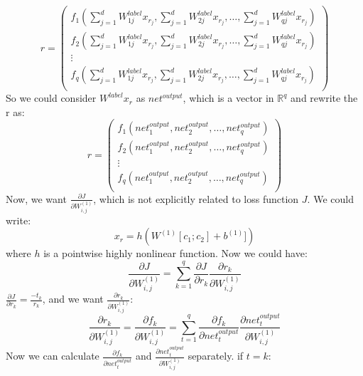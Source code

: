 \documentclass[twoside,12pt]{article}
\begin{document}
\begin{equation}
r =
\begin{pmatrix}
  f_1(\sum_{j=1}^{d}W^{label}_{1j} x_{r_j}, \sum_{j=1}^{d}W^{label}_{2j}x_{r_j},\ldots, \sum_{j=1}^{d}W^{label}_{qj}x_{r_j})\\
   f_2(\sum_{j=1}^{d}W^{label}_{1j}x_{r_j}, \sum_{j=1}^{d}W^{label}_{2j}x_{r_j},\ldots, \sum_{j=1}^{d}W^{label}_{qj}x_{r_j}) \\
  \vdots  \\
    f_q(\sum_{j=1}^{d}W^{label}_{1j}x_{r_j}, \sum_{j=1}^{d}W^{label}_{2j}x_{r_j},\ldots, \sum_{j=1}^{d}W^{label}_{qj}x_{r_j})\\
 \end{pmatrix}
\end{equation}
 So we could consider $W^{label}x_r$ as $net^{output}$, which is a vector in $\mathbb{R}^q$ and rewrite the r as:
 \begin{equation}
 r=
 \begin{pmatrix}
 f_1(net^{output}_1,net^{output}_2,\ldots,net^{output}_q)\\
  f_2(net^{output}_1,net^{output}_2,\ldots,net^{output}_q)\\
\vdots \\
 f_q(net^{output}_1,net^{output}_2,\ldots,net^{output}_q)\\
 \end{pmatrix}
\end{equation}
Now, we want $\frac{\partial J}{\partial W^{(1)}_{i,j}}$, which is not explicitly related to loss function $J$. We could write:
\begin{equation}
x_r=h(W^{(1)}[c_1;c_2]+b^{(1)}])
\end{equation} 
where $h$ is a pointwise highly nonlinear function. Now we could have:
\begin{equation}
\frac{\partial J}{\partial W^{(1)}_{i,j}}=\sum_{k=1}^q\frac{\partial J}{\partial r_k}\frac{\partial r_k}{\partial W^{(1)}_{i,j}}
\end{equation}
$\frac{\partial J}{\partial r_k}=\frac{-t_k}{r_k}$, and we want $\frac{\partial r_k}{\partial W^{(1)}_{i,j}}$:
\begin{equation}
\frac{\partial r_k}{\partial W^{(1)}_{i,j}}=\frac{\partial f_k}{\partial W^{(1)}_{i,j}}=\sum_{t=1}^{q}\frac{\partial f_k}{\partial net^{output}_{t}}\frac{\partial net^{output}_t}{\partial W^{(1)}_{i,j}}
\end{equation}
Now we can calculate $\frac{\partial f_k}{\partial net^{output}_{t}}$ and $\frac{\partial net^{output}_t}{\partial W^{(1)}_{i,j}}$ separately. if $t=k$:
\end{document}
